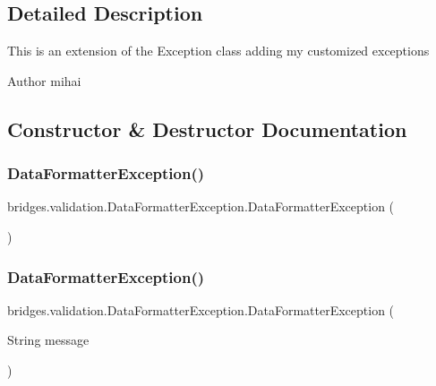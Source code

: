\subsection{Detailed Description}
This is an extension of the Exception class adding my customized exceptions \begin{DoxyAuthor}{Author}
mihai 
\end{DoxyAuthor}


\subsection{Constructor \& Destructor Documentation}
\hypertarget{classbridges_1_1validation_1_1_data_formatter_exception_aa922b9fa359b89c0b25eaa1efd0cfd07}{}\label{classbridges_1_1validation_1_1_data_formatter_exception_aa922b9fa359b89c0b25eaa1efd0cfd07} 
\subsubsection{\texorpdfstring{Data\+Formatter\+Exception()}{DataFormatterException()}\hspace{0.1cm}{\footnotesize\ttfamily [1/4]}}
{\footnotesize\ttfamily bridges.\+validation.\+Data\+Formatter\+Exception.\+Data\+Formatter\+Exception (\begin{DoxyParamCaption}{ }\end{DoxyParamCaption})}

\hypertarget{classbridges_1_1validation_1_1_data_formatter_exception_abadd66eb3ea98c1af1ff397912ed73bf}{}\label{classbridges_1_1validation_1_1_data_formatter_exception_abadd66eb3ea98c1af1ff397912ed73bf} 
\subsubsection{\texorpdfstring{Data\+Formatter\+Exception()}{DataFormatterException()}\hspace{0.1cm}{\footnotesize\ttfamily [2/4]}}
{\footnotesize\ttfamily bridges.\+validation.\+Data\+Formatter\+Exception.\+Data\+Formatter\+Exception (\begin{DoxyParamCaption}\item[{String}]{message }\end{DoxyParamCaption})}

